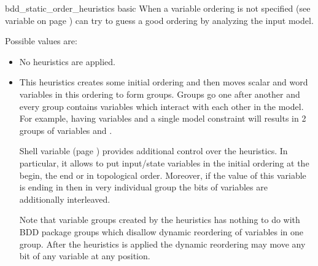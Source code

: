 \begin{nusmvVar} {bdd\_static\_order\_heuristics}
   {}{basic}
\label{bdd_static_order_heuristics}
%
 When a variable ordering is not specified (see variable
  on page \pageref{input_order_file})
 \nusmv can try to guess a good ordering by analyzing the input model.

 Possible values are:
\begin{itemize}
\item {} No heuristics are applied.
\item {} This heuristics creates some initial ordering
 and then moves scalar and word variables in this ordering to form
 groups. Groups go one after another and every group contains
 variables which interact with each other in the model. For example,
 having variables  and a single model constraint
  will results
 in 2 groups of variables  and .

 Shell variable  (page
 \pageref{vars_order_type}) provides additional control over the
 heuristics. In particular, it allows to put input/state variables in
 the initial ordering at the begin, the end or in topological order.
 Moreover, if the value of this variable is ending in 
 then in very individual group the bits of variables are additionally
 interleaved.

 Note that variable groups created by the heuristics has nothing to do
 with BDD package groups which disallow dynamic reordering of
 variables in one group. After the heuristics is applied the dynamic
 reordering may move any bit of any variable at any position.

\end{itemize}
\end{nusmvVar}


\label{build::model}


